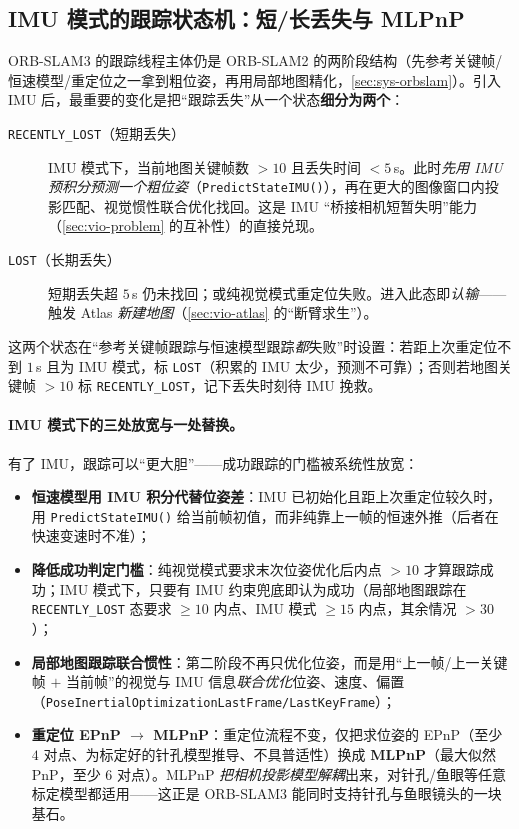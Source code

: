 \subsection{IMU 模式的跟踪状态机：短/长丢失与 MLPnP}
\label{sec:vio-orbslam3-track}

ORB-SLAM3 的跟踪线程主体仍是 ORB-SLAM2 的两阶段结构（先参考关键帧/恒速模型/重定位之一拿到粗位姿，再用局部地图精化，\cref{sec:sys-orbslam}）。引入 IMU 后，最重要的变化是把“跟踪丢失”从一个状态\textbf{细分为两个}\cite{campos2021orbslam3}：

\begin{description}
  \item[\texttt{RECENTLY\_LOST}（短期丢失）] IMU 模式下，当前地图关键帧数 $>10$ 且丢失时间 $<5\,$s。此时\emph{先用 IMU 预积分预测一个粗位姿}（\texttt{PredictStateIMU()}），再在更大的图像窗口内投影匹配、视觉惯性联合优化找回。这是 IMU “桥接相机短暂失明”能力（\cref{sec:vio-problem} 的互补性）的直接兑现。
  \item[\texttt{LOST}（长期丢失）] 短期丢失超 $5\,$s 仍未找回；或纯视觉模式重定位失败。进入此态即\emph{认输}——触发 Atlas \emph{新建地图}（\cref{sec:vio-atlas} 的“断臂求生”）。
\end{description}

这两个状态在“参考关键帧跟踪与恒速模型跟踪\emph{都}失败”时设置：若距上次重定位不到 $1\,$s 且为 IMU 模式，标 \texttt{LOST}（积累的 IMU 太少，预测不可靠）；否则若地图关键帧 $>10$ 标 \texttt{RECENTLY\_LOST}，记下丢失时刻待 IMU 挽救。

\paragraph{IMU 模式下的三处放宽与一处替换。}
有了 IMU，跟踪可以“更大胆”——成功跟踪的门槛被系统性放宽\cite{campos2021orbslam3}：
\begin{itemize}
  \item \textbf{恒速模型用 IMU 积分代替位姿差}：IMU 已初始化且距上次重定位较久时，用 \texttt{PredictStateIMU()} 给当前帧初值，而非纯靠上一帧的恒速外推（后者在快速变速时不准）；
  \item \textbf{降低成功判定门槛}：纯视觉模式要求末次位姿优化后内点 $>10$ 才算跟踪成功；IMU 模式下，只要有 IMU 约束兜底即认为成功（局部地图跟踪在 \texttt{RECENTLY\_LOST} 态要求 $\ge 10$ 内点、IMU 模式 $\ge 15$ 内点，其余情况 $>30$）；
  \item \textbf{局部地图跟踪联合惯性}：第二阶段不再只优化位姿，而是用“上一帧/上一关键帧 $+$ 当前帧”的视觉与 IMU 信息\emph{联合优化}位姿、速度、偏置（\texttt{PoseInertialOptimizationLastFrame/LastKeyFrame}）；
  \item \textbf{重定位 EPnP $\to$ MLPnP}：重定位流程不变，仅把求位姿的 EPnP（至少 $4$ 对点、为标定好的针孔模型推导、不具普适性）换成 \textbf{MLPnP}（最大似然 PnP，至少 $6$ 对点）。MLPnP \emph{把相机投影模型解耦}出来，对针孔/鱼眼等任意标定模型都适用——这正是 ORB-SLAM3 能同时支持针孔与鱼眼镜头的一块基石。
\end{itemize}

